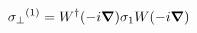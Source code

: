 \begin{equation}
{\sigma_{\perp}}^{(1)} = W^{\dag} (-i \mbox{\boldmath $\nabla$}) \sigma_{1} W (-i \mbox{\boldmath $\nabla$}) \nonumber
\end{equation}

